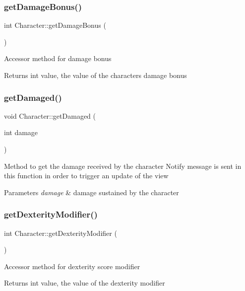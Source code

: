 \subsubsection{\texorpdfstring{get\+Damage\+Bonus()}{getDamageBonus()}}
{\footnotesize\ttfamily int Character\+::get\+Damage\+Bonus (\begin{DoxyParamCaption}{ }\end{DoxyParamCaption})}

Accessor method for damage bonus \begin{DoxyReturn}{Returns}
int value, the value of the character\textquotesingle{}s damage bonus 
\end{DoxyReturn}
\hypertarget{class_character_a43566a6c7af77bde11b8f4c5e86c936f}{}\label{class_character_a43566a6c7af77bde11b8f4c5e86c936f} 
\subsubsection{\texorpdfstring{get\+Damaged()}{getDamaged()}}
{\footnotesize\ttfamily void Character\+::get\+Damaged (\begin{DoxyParamCaption}\item[{int}]{damage }\end{DoxyParamCaption})}

Method to get the damage received by the character Notify message is sent in this function in order to trigger an update of the view 
\begin{DoxyParams}{Parameters}
{\em damage} & damage sustained by the character \\
\hline
\end{DoxyParams}
\hypertarget{class_character_ab4732b634d516b397142462b33e05782}{}\label{class_character_ab4732b634d516b397142462b33e05782} 
\subsubsection{\texorpdfstring{get\+Dexterity\+Modifier()}{getDexterityModifier()}}
{\footnotesize\ttfamily int Character\+::get\+Dexterity\+Modifier (\begin{DoxyParamCaption}{ }\end{DoxyParamCaption})}

Accessor method for dexterity score modifier \begin{DoxyReturn}{Returns}
int value, the value of the dexterity modifier 
\end{DoxyReturn}
\hypertarget{class_character_ac83cb6a4ea280a1e99418af81c4bae6c}{}\label{class_character_ac83cb6a4ea280a1e99418af81c4bae6c} 
